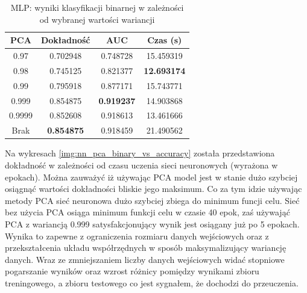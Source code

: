 \documentclass[a4paper, twoside, 11pt, openright]{article}
\begin{document}
\begin{table}[H]
    \centering
    \begin{tabular}{|c|c|c|c|}
    \hline
        \textbf{PCA} & \textbf{Dokładność} &  \textbf{AUC} &  \textbf{Czas (s)} \\ \hline
0.97               &  0.702948 &  0.748728 &   15.459319 \\ \hline
0.98               &  0.745125 &  0.821377 &   \textbf{12.693174} \\ \hline
0.99               &  0.795918 &  0.877171 &   15.743771 \\ \hline
0.999           &  0.854875 &  \textbf{0.919237} &   14.903868 \\ \hline
0.9999             &  0.852608 &  0.918613 &   13.461666 \\ \hline
Brak                &  \textbf{0.854875} &  0.918459 &   21.490562 \\ \hline

    \end{tabular}
    \caption{MLP: wyniki klasyfikacji binarnej w zależności od wybranej wartości wariancji}
    \label{tab:nn_pca_binary}
\end{table}

Na wykresach \ref{img:nn_pca_binary_vs_accuracy} została przedstawiona dokładność w zależności od czasu uczenia sieci neuronowych (wyrażona w epokach). Można zauważyć iż używając PCA model jest w stanie dużo szybciej osiągnąć wartości dokładności bliskie jego maksimum. Co za tym idzie używając metody PCA sieć neuronowa dużo szybciej zbiega do minimum funcji celu. Sieć bez użycia PCA osiąga minimum funkcji celu w czasie 40 epok, zaś używająć PCA z wariancją 0.999 satysfakcjonujący wynik jest osiągany już po 5 epokach. Wynika to zapewne z ograniczenia rozmiaru danych wejściowych oraz z przekształcenia układu współrzędnych w sposób maksymalizujący wariancję danych. Wraz ze zmniejszaniem liczby danych wejściowych widać stopniowe pogarszanie wyników oraz wzrost różnicy pomiędzy wynikami zbioru treningowego, a zbioru testowego co jest sygnałem, że dochodzi do przeuczenia.
\end{document}
